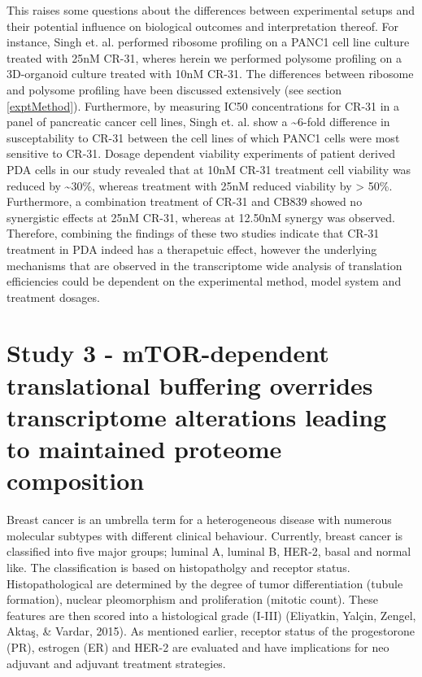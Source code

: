 \documentclass[12pt,openany]{book}
\begin{document}
This raises some questions about the differences between experimental
setups and their potential influence on biological outcomes and
interpretation thereof. For instance, Singh et. al. performed ribosome
profiling on a PANC1 cell line culture treated with 25nM CR-31, wheres
herein we performed polysome profiling on a 3D-organoid culture treated
with 10nM CR-31. The differences between ribosome and polysome profiling
have been discussed extensively (see section \ref{exptMethod}).
Furthermore, by measuring IC50 concentrations for CR-31 in a panel of
pancreatic cancer cell lines, Singh et. al. show a
\textasciitilde{}6-fold difference in susceptability to CR-31 between
the cell lines of which PANC1 cells were most sensitive to CR-31. Dosage
dependent viability experiments of patient derived PDA cells in our
study revealed that at 10nM CR-31 treatment cell viability was reduced
by \textasciitilde{}30\%, whereas treatment with 25nM reduced viability
by \textgreater{} 50\%. Furthermore, a combination treatment of CR-31
and CB839 showed no synergistic effects at 25nM CR-31, whereas at
12.50nM synergy was observed. Therefore, combining the findings of these
two studies indicate that CR-31 treatment in PDA indeed has a
therapetuic effect, however the underlying mechanisms that are observed
in the transcriptome wide analysis of translation efficiencies could be
dependent on the experimental method, model system and treatment
dosages.

\section{Study 3 - mTOR-dependent translational buffering overrides transcriptome alterations leading to
maintained proteome composition}

Breast cancer is an umbrella term for a heterogeneous disease with
numerous molecular subtypes with different clinical behaviour.
Currently, breast cancer is classified into five major groups; luminal
A, luminal B, HER-2, basal and normal like. The classification is based
on histopatholgy and receptor status. Histopathological are determined
by the degree of tumor differentiation (tubule formation), nuclear
pleomorphism and proliferation (mitotic count). These features are then
scored into a histological grade (I-III) (Eliyatkin, Yalçin, Zengel,
Aktaş, \& Vardar, 2015). As mentioned earlier, receptor status of the
progestorone (PR), estrogen (ER) and HER-2 are evaluated and have
implications for neo adjuvant and adjuvant treatment strategies.
\end{document}
